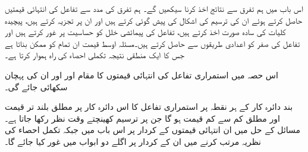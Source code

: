 اس باب میں ہم تفرق سے نتائج اخذ کرنا سیکھیں گے۔ ہم تفرق کی مدد سے تفاعل کی انتہائی قیمتیں حاصل کرتے ہوئے ان کی ترسیم کی اشکال کی پیش گوئی کرتے ہیں اور ان پر تجزیہ کرتے ہیں، پیچیدہ کلیات کی سادہ صورت اخذ کرتے ہیں، تفاعل کی پیمائشی خلل کو حساسیت پر غور کرتے ہیں اور تفاعل کی صفر کو اعدادی طریقوں سے حاصل کرتے ہیں۔مسئلہ اوسط قیمت ان تمام کو ممکن بناتا ہے جس کا ایک منطقی نتیجہ تکملی احصاء کی راہ ہموار کرتا ہے۔  

اس حصہ میں استمراری تفاعل کی انتہائی قیمتوں کا مقام اور اور ان کی پہچان سکھائی جائے گی۔

بند دائرہ کار کے ہر نقطہ پر استمراری تفاعل کا اس دائرہ کار پر مطلق بلند تر قیمت اور مطلق کم سے کم قیمت ہو گا جن پر ترسیم کھینچتے وقت  نظر رکھا جاتا ہے۔ مسائل کے حل میں ان انتہائی قیمتوں  کے کردار پر اس باب میں  جبکہ تکمل احصاء کی  نظریہ مرتب کرنے میں ان کے کردار پر اگلے دو ابواب میں غور کیا جائے گا۔  

